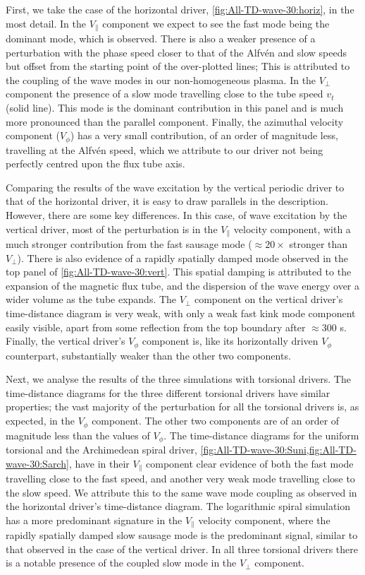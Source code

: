 First, we take the case of the horizontal driver, \cref{fig:All-TD-wave-30:horiz}, in the most detail. 
In the $V_\parallel$ component we expect to see the fast mode being the dominant mode, which is observed.
There is also a weaker presence of a perturbation with the phase speed closer to that of the Alfv\'en and slow speeds but offset from the starting point of the over-plotted lines; This is attributed to the coupling of the wave modes in our non-homogeneous plasma.
In the $V_\perp$ component the presence of a slow mode travelling close to the tube speed $v_t$ (solid line).
This mode is the dominant contribution in this panel and is much more pronounced than the parallel component. 
Finally, the azimuthal velocity component ($V_\phi$) has a very small contribution, of an order of magnitude less, travelling at the Alfv\'en speed, which we attribute to our driver not being perfectly centred upon the flux tube axis.

Comparing the results of the wave excitation by the vertical periodic driver to that of the horizontal driver, it is easy to draw parallels in the description.
However, there are some key differences. 
In this case, of wave excitation by the vertical driver, most of the perturbation is in the $V_\parallel$ velocity component, with a much stronger contribution from the fast sausage mode ($\approx 20 \times$ stronger than $V_\perp$).
There is also evidence of a rapidly spatially damped mode observed in the top panel of \cref{fig:All-TD-wave-30:vert}.
This spatial damping is attributed to the expansion of the magnetic flux tube, and the dispersion of the wave energy over a wider volume as the tube expands.
The $V_\perp$ component on the vertical driver's time-distance diagram is very weak, with only a weak fast kink mode component easily visible, apart from some reflection from the top boundary after $\approx300$ s. 
Finally, the vertical driver's $V_\phi$ component is, like its horizontally driven $V_\phi$ counterpart, substantially weaker than the other two components.

Next, we analyse the results of the three simulations with torsional drivers.
The time-distance diagrams for the three different torsional drivers have similar properties; the vast majority of the perturbation for all the torsional drivers is, as expected, in the $V_\phi$ component.
The other two components are of an order of magnitude less than the values of $V_\phi$.
The time-distance diagrams for the uniform torsional and the Archimedean spiral driver, \cref{fig:All-TD-wave-30:Suni,fig:All-TD-wave-30:Sarch}, have in their $V_\parallel$ component clear evidence of both the fast mode travelling close to the fast speed, and another very weak mode travelling close to the slow speed.
We attribute this to the same wave mode coupling as observed in the horizontal driver's time-distance diagram. 
The logarithmic spiral simulation has a more predominant signature in the $V_\parallel$ velocity component, where the rapidly spatially damped slow sausage mode is the predominant signal, similar to that observed in the case of the vertical driver. 
In all three torsional drivers there is a notable presence of the coupled slow mode in the $V_\perp$ component. 

